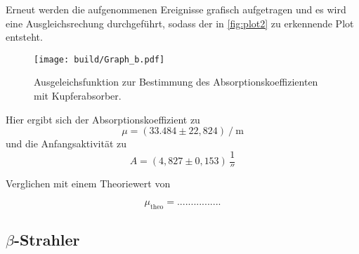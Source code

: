   Erneut werden die aufgenommenen Ereignisse grafisch aufgetragen und es wird eine Ausgleichsrechung durchgeführt, sodass der in \autoref{fig:plot2} zu erkennende Plot entsteht.

  \begin{figure}[H]
      \centering
      \texttt{[image: build/Graph\_b.pdf]}
      \caption{Ausgeleichsfunktion zur Bestimmung des Absorptionskoeffizienten mit Kupferabsorber.}
      \label{fig:plot2}
  \end{figure}

Hier ergibt sich der Absorptionskoeffizient zu
\begin{equation*}
    \mu =  \left(33.484 \pm 22,824\right) \mathbin{/} \unit{\meter}
\end{equation*}
und die Anfangsaktivität zu
\begin{equation*}
    A = (4,827 \pm 0,153) \, \unit{\frac{1}{\second}}
\end{equation*}

Verglichen mit einem Theoriewert von %

\begin{equation*}
    \mu_{\text{theo}} = ................
\end{equation*}

\subsection*{$\beta$-Strahler}

